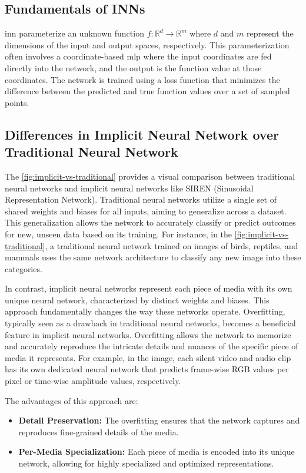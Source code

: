 \documentclass{ioereport}
\begin{document}
    \subsection{Fundamentals of INNs}
    \gls{inn} parameterize an unknown function \( f: \mathbb{R}^d \rightarrow \mathbb{R}^m \) where \( d \) and \( m \) represent the dimensions of the input and output spaces, respectively. This parameterization often involves a coordinate-based \gls{mlp} where the input coordinates are fed directly into the network, and the output is the function value at those coordinates. The network is trained using a loss function that minimizes the difference between the predicted and true function values over a set of sampled points.

    \subsection{Differences in Implicit Neural Network over Traditional Neural Network}

    The \autoref{fig:implicit-vs-traditional} provides a visual comparison between traditional neural networks and implicit neural networks like SIREN (Sinusoidal Representation Network). Traditional neural networks utilize a single set of shared weights and biases for all inputs, aiming to generalize across a dataset. This generalization allows the network to accurately classify or predict outcomes for new, unseen data based on its training. For instance, in the \autoref{fig:implicit-vs-traditional}, a traditional neural network trained on images of birds, reptiles, and mammals uses the same network architecture to classify any new image into these categories.

    In contrast, implicit neural networks represent each piece of media with its own unique neural network, characterized by distinct weights and biases. This approach fundamentally changes the way these networks operate. Overfitting, typically seen as a drawback in traditional neural networks, becomes a beneficial feature in implicit neural networks. Overfitting allows the network to memorize and accurately reproduce the intricate details and nuances of the specific piece of media it represents. For example, in the image, each silent video and audio clip has its own dedicated neural network that predicts frame-wise RGB values per pixel or time-wise amplitude values, respectively.

    The advantages of this approach are:

    \begin{itemize}
        \item \textbf{Detail Preservation:} The overfitting ensures that the network captures and reproduces fine-grained details of the media.
        \item \textbf{Per-Media Specialization:} Each piece of media is encoded into its unique network, allowing for highly specialized and optimized representations.
    \end{itemize}
\end{document}
